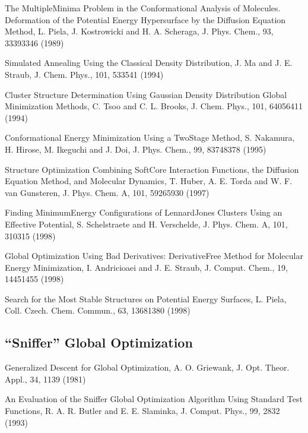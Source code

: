 \documentclass[letterpaper,11pt,english]{sphinxmanual}
\begin{document}
\sphinxAtStartPar
The Multiple\sphinxhyphen{}Minima Problem in the Conformational Analysis of Molecules. Deformation of the Potential Energy Hypersurface by the Diffusion Equation Method, L. Piela, J. Kostrowicki and H. A. Scheraga, J. Phys. Chem., 93, 3339\sphinxhyphen{}3346 (1989)

\sphinxAtStartPar
Simulated Annealing Using the Classical Density Distribution, J. Ma and J. E. Straub, J. Chem. Phys., 101, 533\sphinxhyphen{}541 (1994)

\sphinxAtStartPar
Cluster Structure Determination Using Gaussian Density Distribution Global Minimization Methods, C. Tsoo and C. L. Brooks, J. Chem. Phys., 101, 6405\sphinxhyphen{}6411 (1994)

\sphinxAtStartPar
Conformational Energy Minimization Using a Two\sphinxhyphen{}Stage Method, S. Nakamura, H. Hirose, M. Ikeguchi and J. Doi, J. Phys. Chem., 99, 8374\sphinxhyphen{}8378 (1995)

\sphinxAtStartPar
Structure Optimization Combining Soft\sphinxhyphen{}Core Interaction Functions, the Diffusion Equation Method, and Molecular Dynamics, T. Huber, A. E. Torda and W. F. van Gunsteren, J. Phys. Chem. A, 101, 5926\sphinxhyphen{}5930 (1997)

\sphinxAtStartPar
Finding Minimum\sphinxhyphen{}Energy Configurations of Lennard\sphinxhyphen{}Jones Clusters Using an Effective Potential, S. Schelstraete and H. Verschelde, J. Phys. Chem. A, 101, 310\sphinxhyphen{}315 (1998)

\sphinxAtStartPar
Global Optimization Using Bad Derivatives: Derivative\sphinxhyphen{}Free Method for Molecular Energy Minimization, I. Andricioaei and J. E. Straub, J. Comput. Chem., 19, 1445\sphinxhyphen{}1455 (1998)

\sphinxAtStartPar
Search for the Most Stable Structures on Potential Energy Surfaces, L. Piela, Coll. Czech. Chem. Commun., 63, 1368\sphinxhyphen{}1380 (1998)


\subsection{“Sniffer” Global Optimization}
\label{\detokenize{text/references:sniffer-global-optimization}}
\sphinxAtStartPar
Generalized Descent for Global Optimization, A. O. Griewank, J. Opt. Theor. Appl., 34, 11\sphinxhyphen{}39 (1981)

\sphinxAtStartPar
An Evaluation of the Sniffer Global Optimization Algorithm Using Standard Test Functions, R. A. R. Butler and E. E. Slaminka, J. Comput. Phys., 99, 28\sphinxhyphen{}32 (1993)
\end{document}
